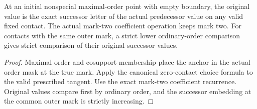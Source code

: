 \begin{theorem}
\label{hir:g8-initial-exact-fixed-contact}
\leanok
At an initial nonspecial maximal-order point with empty boundary,
the original value is the exact successor letter of the actual
predecessor value on any valid fixed contact. The actual mark-two
coefficient operation keeps mark two. For contacts with the same
outer mark, a strict lower ordinary-order comparison gives strict
comparison of their original successor values.
\end{theorem}
\begin{proof}
Maximal order and cosupport membership place the anchor in the
actual order mask at the true mark. Apply the canonical
zero-contact choice formula to the valid prescribed tangent.
Use the exact mark-two coefficient recurrence. Original values
compare first by ordinary order, and the successor embedding
at the common outer mark is strictly increasing.
\end{proof}

